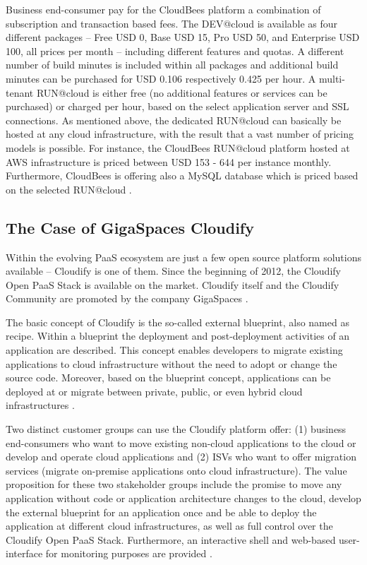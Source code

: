 Business end-consumer pay for the CloudBees platform a combination of subscription and transaction based fees. The DEV@cloud is available as four different packages -- Free USD 0, Base USD 15, Pro USD 50, and Enterprise USD 100, all prices per month -- including different features and quotas. A different number of build minutes is included within all packages and additional build minutes can be purchased for USD 0.106 respectively 0.425 per hour. A multi-tenant RUN@cloud is either free (no additional features or services can be purchased) or charged per hour, based on the select application server and SSL connections. As mentioned above, the dedicated RUN@cloud can basically be hosted at any cloud infrastructure, with the result that a vast number of pricing models is possible. For instance, the CloudBees RUN@cloud platform hosted at \ac{AWS} infrastructure is priced between USD 153 - 644 per instance monthly. Furthermore, CloudBees is offering also a MySQL database which is priced based on the selected RUN@cloud \citep{CloudBees2013}.



\subsection{The Case of GigaSpaces Cloudify}\label{ch:sota:gsc}

Within the evolving \ac{PaaS} ecosystem are just a few open source platform solutions available -- Cloudify is one of them. Since the beginning of 2012, the Cloudify Open \ac{PaaS} Stack is available on the market. Cloudify itself and the Cloudify Community are promoted by the company GigaSpaces \citep{GigaSpaces2013a}.

The basic concept of Cloudify is the so-called external blueprint, also named as recipe. Within a blueprint the deployment and post-deployment activities of an application are described. This concept enables developers to migrate existing applications to cloud infrastructure without the need to adopt or change the source code. Moreover, based on the blueprint concept, applications can be deployed at or migrate between private, public, or even hybrid cloud infrastructures \citep{GigaSpaces2013a}.

Two distinct customer groups can use the Cloudify platform offer: (1) business end-consumers who want to move existing non-cloud applications to the cloud or develop and operate cloud applications and (2) \acp{ISV} who want to offer migration services (migrate on-premise applications onto cloud infrastructure). The value proposition for these two stakeholder groups include the promise to move any application without code or application architecture changes to the cloud, develop the external blueprint for an application once and be able to deploy the application at different cloud infrastructures, as well as full control over the Cloudify Open \ac{PaaS} Stack. Furthermore, an interactive shell and web-based user-interface for monitoring purposes are provided \citep{GigaSpaces2013a}.

